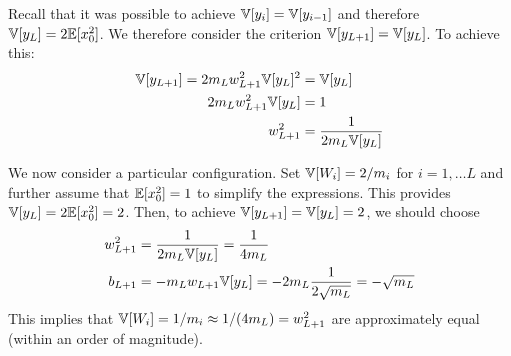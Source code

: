 Recall that it was possible to achieve $\mathbb{V}[y_{i}] = \mathbb{V}[y_{i-1}]$ and therefore $\mathbb{V}[y_{L}] = 2 \mathbb{E}[x_{0}^2]$. %
We therefore consider the criterion $\mathbb{V}[y_{L+1}] = \mathbb{V}[y_{L}]$.
To achieve this:
\begin{align}
\mathbb{V}[y_{L+1}] = 2 m_{L} w_{L+1}^2 \mathbb{V}[y_{L}]^2 & = \mathbb{V}[y_{L}] \\
2 m_{L} w_{L+1}^2 \mathbb{V}[y_{L}] & = 1 \\
w_{L+1}^2 & = \frac{1}{2 m_{L} \mathbb{V}[y_{L}]}
\end{align}



We now consider a particular configuration.
Set $\mathbb{V}[W_{i}] = 2 / m_{i}$ for $i = 1, \dots L$ and further assume that $\mathbb{E}[x_{0}^{2}] = 1$ to simplify the expressions.
This provides $\mathbb{V}[y_{L}] = 2 \mathbb{E}[x_{0}^2] = 2$.
Then, to achieve $\mathbb{V}[y_{L+1}] = \mathbb{V}[y_{L}] = 2$, we should choose
\begin{align}
w_{L+1}^2 & = \frac{1}{2 m_{L} \mathbb{V}[y_{L}]} = \frac{1}{4 m_{L}} \\
b_{L+1} & = -m_{L} w_{L+1} \mathbb{V}[y_{L}] = -2 m_{L} \frac{1}{2 \sqrt{m_{L}}} = -\sqrt{m_{L}}
\end{align}
This implies that $\mathbb{V}[W_{i}] = 1 / m_{i} \approx 1 / (4 m_{L}) = w_{L+1}^2$ are approximately equal (within an order of magnitude).

